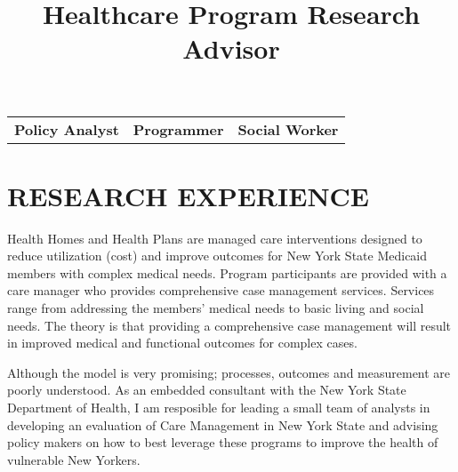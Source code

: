\documentclass[line, margin, 10pt]{res}
\begin{document}
 

\address{26 Van Schoick Albany, NY 12208}
\address{andy.choens@gmail.com  (518) 275 - 5984}

\begin{resume}

  \vspace{.01in}
  \begin{tabular} {c | c | c}
    {\bf Policy Analyst} & {\bf Programmer} & {\bf Social Worker}
  \end{tabular}
  \vspace{.01in}

  \section{RESEARCH EXPERIENCE}


  \title{Healthcare Program Research Advisor}
  \begin{position}
    Health Homes and Health Plans are managed care interventions
    designed to reduce utilization (cost) and improve outcomes for New
    York State Medicaid members with complex medical needs. Program
    participants are provided with a care manager who provides
    comprehensive case management services. Services range from
    addressing the members' medical needs to basic living and social
    needs. The theory is that providing a comprehensive case
    management will result in improved medical and functional outcomes
    for complex cases.

    Although the model is very promising; processes, outcomes and
    measurement are poorly understood. As an embedded consultant with
    the New York State Department of Health, I am resposible for
    leading a small team of analysts in developing an evaluation of
    Care Management in New York State and advising policy makers on
    how to best leverage these programs to improve the health of
    vulnerable New Yorkers.
  \end{position}


\end{resume}
\end{document}
